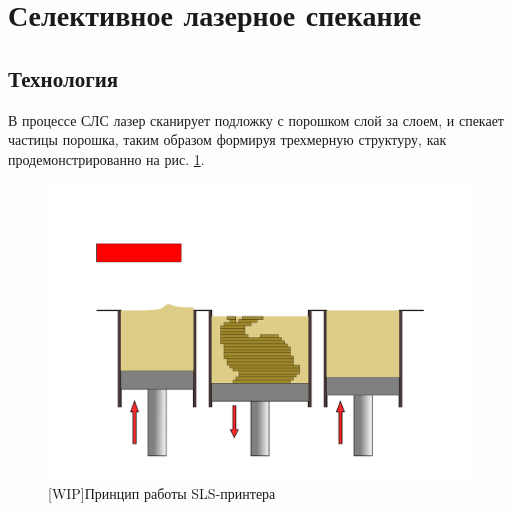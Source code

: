 \section{Селективное лазерное спекание}


\subsection{Технология}
В процессе СЛС лазер сканирует подложку с порошком слой за слоем, и спекает частицы порошка, таким образом формируя трехмерную структуру, как продемонстрированно на рис. \ref{fig:printer}. 

\begin{figure}[h!]
    \centering
    \includegraphics[width=\linewidth]{fig/sls-2d.pdf}
    \caption{[WIP]Принцип работы SLS-принтера}
    \label{fig:printer}
\end{figure}

